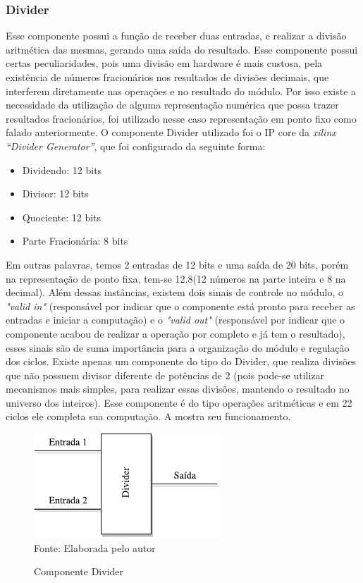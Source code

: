 \subsubsection{Divider}
Esse componente possui a função de receber duas entradas, e realizar a divisão aritmética das mesmas, gerando uma saída do resultado. Esse componente possui certas peculiaridades, pois uma divisão em hardware é mais custosa, pela existência de números fracionários nos resultados de divisões decimais, que interferem diretamente nas operações e no resultado do módulo. Por isso existe a necessidade da utilização de alguma representação numérica que possa trazer resultados fracionários, foi utilizado nesse caso representação em ponto fixo como falado anteriormente. O componente Divider utilizado foi o IP core da \textit{xilinx “Divider Generator”}, que foi configurado da seguinte forma: 
\begin{itemize}
	\item 	Dividendo: 12 bits
	\item 	Divisor: 12 bits
	\item 	Quociente: 12 bits
	\item 	Parte Fracionária: 8 bits
\end{itemize}
Em outras palavras, temos 2 entradas de 12 bits e uma saída de 20 bits, porém na representação de ponto fixa, tem-se 12.8(12 números na parte inteira e 8 na decimal). Além dessas instâncias, existem dois sinais de controle no módulo, o \textit{"valid in"} (responsável por indicar que o componente está pronto para receber as entradas e iniciar a computação) e o \textit{"valid out"} (responsável por indicar que o componente acabou de realizar a operação por completo e já tem o resultado), esses sinais são de suma importância para a organização do módulo e regulação dos ciclos. Existe apenas um componente do tipo do Divider, que realiza divisões que não possuem divisor diferente de potências de 2 (pois pode-se utilizar mecanismos mais simples, para realizar essas divisões, mantendo o resultado no universo dos inteiros). Esse componente é do tipo operações aritméticas e em 22 ciclos ele completa sua computação. A  mostra seu funcionamento.

\begin{figure}[H]
	\centering
	\caption{Componente Divider}
	\includegraphics[width=7cm]{figures/Divider.pdf}\\
	
	{Fonte: Elaborada pelo autor}
	\label{divider}
\end{figure}


